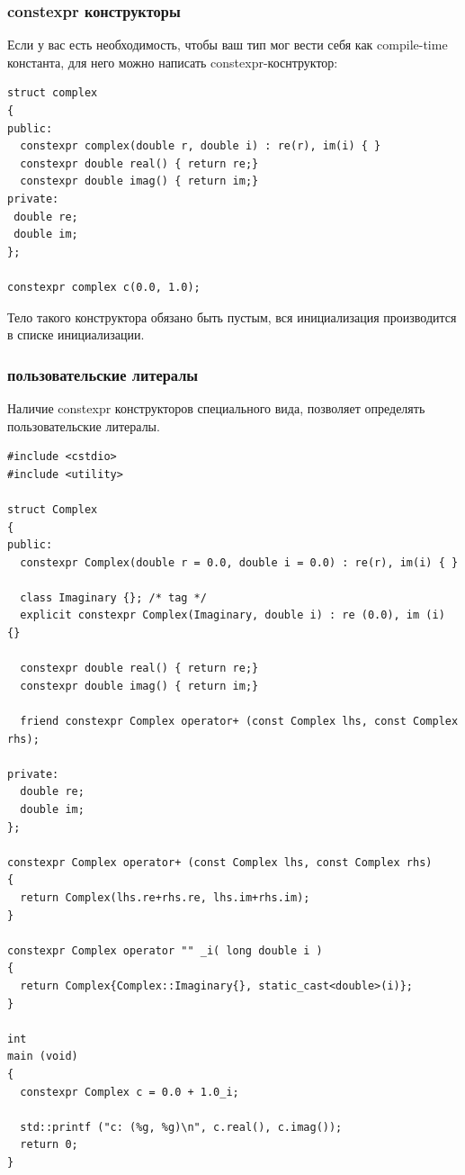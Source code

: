 \documentclass[a4paper,12pt,oneside]{article}
\begin{document}
\subsubsection{constexpr конструкторы}

Если у вас есть необходимость, чтобы ваш тип мог вести себя как compile-time константа, для него можно написать constexpr-коснтруктор:

\begin{lstlisting}
struct complex
{
public:
  constexpr complex(double r, double i) : re(r), im(i) { }
  constexpr double real() { return re;}
  constexpr double imag() { return im;}
private:
 double re;
 double im;
};

constexpr complex c(0.0, 1.0);
\end{lstlisting}

Тело такого конструктора обязано быть пустым, вся инициализация производится в списке инициализации.

\subsubsection{пользовательские литералы}

Наличие constexpr конструкторов специального вида, позволяет определять пользовательские литералы.

\begin{lstlisting}
#include <cstdio>
#include <utility>

struct Complex
{
public:
  constexpr Complex(double r = 0.0, double i = 0.0) : re(r), im(i) { }

  class Imaginary {}; /* tag */
  explicit constexpr Complex(Imaginary, double i) : re (0.0), im (i) {}

  constexpr double real() { return re;}
  constexpr double imag() { return im;}

  friend constexpr Complex operator+ (const Complex lhs, const Complex rhs);

private:
  double re;
  double im;
};

constexpr Complex operator+ (const Complex lhs, const Complex rhs)
{
  return Complex(lhs.re+rhs.re, lhs.im+rhs.im);
}

constexpr Complex operator "" _i( long double i )
{
  return Complex{Complex::Imaginary{}, static_cast<double>(i)};
}

int
main (void)
{
  constexpr Complex c = 0.0 + 1.0_i;

  std::printf ("c: (%g, %g)\n", c.real(), c.imag());
  return 0;
}
\end{lstlisting}
\end{document}
